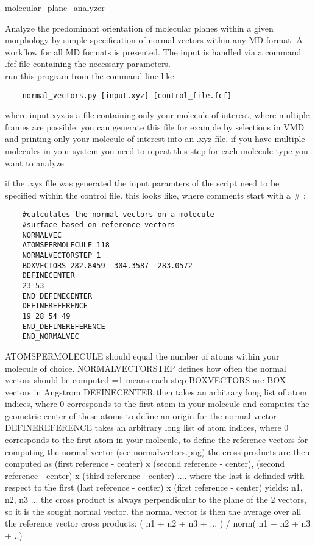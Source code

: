 \documentclass{article}
\begin{document}
	 {\Large molecular\_plane\_analyzer}
	 
	Analyze the predominant orientation of molecular planes within a given morphology by simple specification of normal vectors within any MD format. 
	A workflow for all MD formats is presented. The input is handled via a command .fcf file containing the necessary parameters.\\
	
	run this program from the command line like:
	\begin{lstlisting}
	normal_vectors.py [input.xyz] [control_file.fcf]
	\end{lstlisting}
	
	where input.xyz is a file containing only your molecule of interest, where multiple frames are possible. you can generate this file for example by selections in VMD and printing only your molecule of interest into an .xyz file.
	if you have multiple molecules in your system you need to repeat this step for each molecule type you want to analyze
	
	if the .xyz file was generated the input paramters of the script need to be specified within the control file. this looks like, where comments start with a \# :
	\begin{lstlisting}
	#calculates the normal vectors on a molecule 
	#surface based on reference vectors
	NORMALVEC
	ATOMSPERMOLECULE 118
	NORMALVECTORSTEP 1
	BOXVECTORS 282.8459  304.3587  283.0572
	DEFINECENTER
	23 53
	END_DEFINECENTER
	DEFINEREFERENCE
	19 28 54 49
	END_DEFINEREFERENCE
	END_NORMALVEC
	\end{lstlisting}
	ATOMSPERMOLECULE should equal the number of atoms within your molecule of choice.
	NORMALVECTORSTEP defines how often the normal vectors should be computed =1 means each step
	BOXVECTORS are BOX vectors in Angstrom
	DEFINECENTER then takes an arbitrary long list of atom indices, where 0 corresponds to the first atom in your molecule and computes the geometric center of these atoms to define an origin for the normal vector
	DEFINEREFERENCE takes an arbitrary long list of atom indices, where 0 corresponds to the first atom in your molecule, to define the reference vectors for computing the normal vector (see normalvectors.png)
	the cross products are then computed as (first reference - center) x (second reference - center),  (second reference - center) x (third reference - center) .... where the last is definded with respect to the first (last reference - center) x (first reference - center)
	yields: n1, n2, n3 ...
	the cross product is always perpendicular to the plane of the 2 vectors, so it is the sought normal vector. the normal vector is then the average over all the reference vector cross products: ( n1 + n2 + n3 + ... ) / norm( n1 + n2 + n3 + ..)
	
\end{document}

